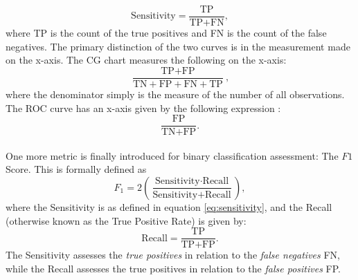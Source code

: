         	\begin{equation}\label{eq:sensitivity}
        		\text{Sensitivity} = \frac{\text{TP}}{\text{TP} + \text{FN}},
        	\end{equation}
        	where TP is the count of the true positives and FN is the count of the false negatives. The primary distinction of the two curves is in the measurement made on the x-axis. The CG chart measures the following on the x-axis:
        	\begin{equation}
        		\frac{\text{TP} + \text{FP}}{\text{TN} + \text{FP} + \text{FN} + \text{TP}},
        	\end{equation}
        	where the denominator simply is the measure of the number of all observations. The ROC curve has an x-axis given by the following expression \cite{6}:
        	\begin{equation}
        		\frac{\text{FP}}{\text{TN} + \text{FP}}.
        	\end{equation}\\
            One more metric is finally introduced for binary classification assessment: The $F1$ Score. This is formally defined as
            \begin{equation}
                F_1 = 2\left(\frac{\text{Sensitivity}\cdot \text{Recall}}{\text{Sensitivity} + \text{Recall}}\right),
            \end{equation}
            where the Sensitivity is as defined in equation \ref{eq:sensitivity}, and the Recall (otherwise known as the True Positive Rate) is given by:
            \begin{equation}
                \text{Recall} = \frac{\text{TP}}{\text{TP}+\text{FP}}.
            \end{equation}
            The Sensitivity assesses the \textit{true positives}  in relation to the \textit{false negatives} FN, while the Recall assesses the true positives in relation to the \textit{false positives} FP\cite{2}.
            
